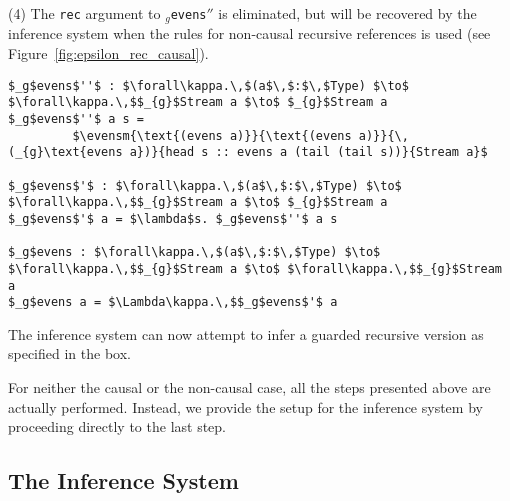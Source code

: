 (4) The \texttt{rec} argument to \texttt{$_{g}$evens$''$} is eliminated, but will
be recovered by the inference system when the rules for non-causal recursive
references is used (see Figure~\ref{fig:epsilon_rec_causal}).
\begin{lstlisting}[mathescape]
$_g$evens$''$ : $\forall\kappa.\,$(a$\,$:$\,$Type) $\to$ $\forall\kappa.\,$$_{g}$Stream a $\to$ $_{g}$Stream a
$_g$evens$''$ a s =
         $\evensm{\text{(evens a)}}{\text{(evens a)}}{\,(_{g}\text{evens a})}{head s :: evens a (tail (tail s))}{Stream a}$

$_g$evens$'$ : $\forall\kappa.\,$(a$\,$:$\,$Type) $\to$ $\forall\kappa.\,$$_{g}$Stream a $\to$ $_{g}$Stream a
$_g$evens$'$ a = $\lambda$s. $_g$evens$''$ a s

$_g$evens : $\forall\kappa.\,$(a$\,$:$\,$Type) $\to$ $\forall\kappa.\,$$_{g}$Stream a $\to$ $\forall\kappa.\,$$_{g}$Stream a
$_g$evens a = $\Lambda\kappa.\,$$_g$evens$'$ a
\end{lstlisting}
The inference system can now attempt to infer a guarded recursive version as
specified in the box.

For neither the causal or the non-causal case, all the steps presented above are
actually performed. Instead, we provide the setup for the inference system by
proceeding directly to the last step.

\subsection{The Inference System}
\label{sec:inference-system}


